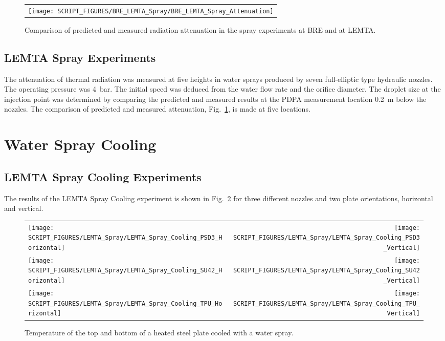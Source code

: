 \begin{figure}[h!]
\begin{center}
\begin{tabular}{c}
\texttt{[image: SCRIPT\_FIGURES/BRE\_LEMTA\_Spray/BRE\_LEMTA\_Spray\_Attenuation]}
\end{tabular}
\end{center}
\caption[Comparison of radiation attenuation, BRE and LEMTA Spray experiments]{Comparison of predicted and measured radiation attenuation in the spray experiments at BRE and at LEMTA.}
\label{BRE_LEMTA_Spray_Attenuation}
\end{figure}


\subsection{LEMTA Spray Experiments}

The attenuation of thermal radiation was measured at five heights in water sprays produced by seven full-elliptic type hydraulic nozzles. The operating pressure was 4~bar. The initial speed was deduced from the water flow rate and the orifice diameter. The droplet size at the injection point was determined by comparing the predicted and measured results at the PDPA measurement location 0.2~m below the nozzles. The comparison of predicted and measured attenuation, Fig.~\ref{BRE_LEMTA_Spray_Attenuation}, is made at five locations.


\clearpage

\section{Water Spray Cooling}

\subsection{LEMTA Spray Cooling Experiments}

The results of the LEMTA Spray Cooling experiment is shown in Fig.~\ref{LEMTA_Spray_Cooling_Fig} for three different nozzles and two plate orientations, horizontal and vertical.

\begin{figure}[h!]
\begin{tabular*}{\textwidth}{l@{\extracolsep{\fill}}r}
\texttt{[image: SCRIPT\_FIGURES/LEMTA\_Spray/LEMTA\_Spray\_Cooling\_PSD3\_Horizontal]} &
\texttt{[image: SCRIPT\_FIGURES/LEMTA\_Spray/LEMTA\_Spray\_Cooling\_PSD3\_Vertical]} \\
\texttt{[image: SCRIPT\_FIGURES/LEMTA\_Spray/LEMTA\_Spray\_Cooling\_SU42\_Horizontal]} &
\texttt{[image: SCRIPT\_FIGURES/LEMTA\_Spray/LEMTA\_Spray\_Cooling\_SU42\_Vertical]} \\
\texttt{[image: SCRIPT\_FIGURES/LEMTA\_Spray/LEMTA\_Spray\_Cooling\_TPU\_Horizontal]} &
\texttt{[image: SCRIPT\_FIGURES/LEMTA\_Spray/LEMTA\_Spray\_Cooling\_TPU\_Vertical]}
\end{tabular*}
\caption[LEMTA Spray Cooling steel plate temperatures]{Temperature of the top and bottom of a heated steel plate cooled with a water spray.}
\label{LEMTA_Spray_Cooling_Fig}
\end{figure}


